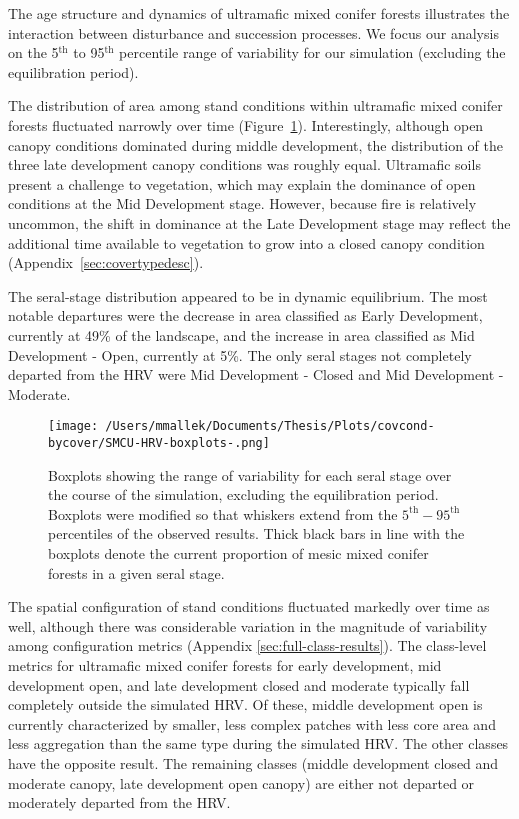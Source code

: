 The age structure and dynamics of ultramafic mixed conifer forests illustrates the interaction between disturbance and succession processes. We focus our analysis on the 5$^{\text{th}}$ to 95$^{\text{th}}$ percentile range of variability for our simulation (excluding the equilibration period). %

The distribution of area among stand conditions within ultramafic mixed conifer forests fluctuated narrowly over time (Figure~\ref{fig:covcond_smcu_boxplots}). Interestingly, although open canopy conditions dominated during middle development, the distribution of the three late development canopy conditions was roughly equal. Ultramafic soils present a challenge to vegetation, which may explain the dominance of open conditions at the Mid Development stage. However, because fire is relatively uncommon, the shift in dominance at the Late Development stage may reflect the additional time available to vegetation to grow into a closed canopy condition (Appendix~\ref{sec:covertypedesc}). %

The seral-stage distribution appeared to be in dynamic equilibrium. The most notable departures were the decrease in area classified as Early Development, currently at 49\% of the landscape, and the increase in area classified as Mid Development - Open, currently at 5\%. The only seral stages not completely departed from the HRV were Mid Development - Closed and Mid Development - Moderate.

\begin{figure}[!htbp]
  \centering
    \texttt{[image: /Users/mmallek/Documents/Thesis/Plots/covcond-bycover/SMCU-HRV-boxplots-.png]}
  \caption{Boxplots showing the range of variability for each seral stage over the course of the simulation, excluding the equilibration period. Boxplots were modified so that whiskers extend from the $5^{\text{th}} - 95^{\text{th}}$ percentiles of the observed results. Thick black bars in line with the boxplots denote the current proportion of mesic mixed conifer forests in a given seral stage.} 
  \label{fig:covcond_smcu_boxplots}
\end{figure}

The spatial configuration of stand conditions fluctuated markedly over time as well, although there was considerable variation in the magnitude of variability among configuration metrics (Appendix \ref{sec:full-class-results}). The class-level metrics for ultramafic mixed conifer forests for early development, mid development open, and late development closed and moderate typically fall completely outside the simulated HRV. Of these, middle development open is currently characterized by smaller, less complex patches with less core area and less aggregation than the same type during the simulated HRV. The other classes have the opposite result. The remaining classes (middle development closed and moderate canopy, late development open canopy) are either not departed or moderately departed from the HRV.


